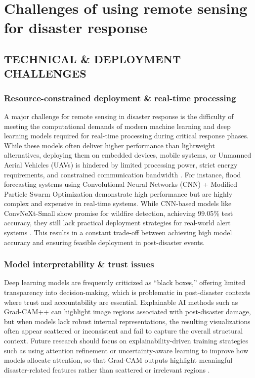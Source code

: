 \documentclass[conference,a4paper]{IEEEtran}
\begin{document}
\section{Challenges of using remote sensing for disaster response}


\subsection{TECHNICAL \& DEPLOYMENT CHALLENGES}

\subsubsection{\textbf{Resource-constrained deployment \& real-time processing}}
A major challenge for remote sensing in disaster response is the difficulty of meeting the computational demands of modern machine learning and deep learning models required for real-time processing during critical response phases. While these models often deliver higher performance than lightweight alternatives, deploying them on embedded devices, mobile systems, or Unmanned Aerial Vehicles (UAVs) is hindered by limited processing power, strict energy requirements, and constrained communication bandwidth \cite{elbohy2025fusion}. For instance, flood forecasting systems using Convolutional Neural Networks (CNN) + Modified Particle Swarm Optimization demonstrate high performance but are highly complex and expensive in real-time systems. While CNN-based models like ConvNeXt-Small show promise for wildfire detection, achieving 99.05\% test accuracy, they still lack practical deployment strategies for real-world alert systems \cite{elbohy2025fusion}. This results in a constant trade-off between achieving high model accuracy and ensuring feasible deployment in post-disaster events.

\subsubsection{\textbf{Model interpretability \& trust issues}}
Deep learning models are frequently criticized as ``black boxes,'' offering limited transparency into decision-making, which is problematic in post-disaster contexts where trust and accountability are essential. Explainable AI methods such as Grad-CAM++ can highlight image regions associated with post-disaster damage, but when models lack robust internal representations, the resulting visualizations often appear scattered or inconsistent and fail to capture the overall structural context. Future research should focus on explainability-driven training strategies such as using attention refinement or uncertainty-aware learning to improve how models allocate attention, so that Grad-CAM outputs highlight meaningful disaster-related features rather than scattered or irrelevant regions \cite{lagapEnhancingPostDisasterDamage2025}.
\end{document}
